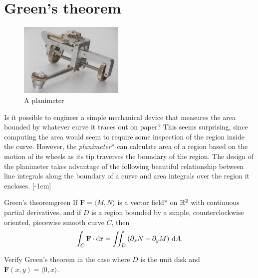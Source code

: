 \documentclass{watsonbook}
\begin{document}
\section{Green's theorem} \label{sec:greens}


\begin{figure}
  \includegraphics[width=5cm]{figures/planimeter}
  \caption{A planimeter \label{fig:planimeter}}
\end{figure}

Is it possible to engineer a simple mechanical device that measures
the area bounded by whatever curve it traces out on paper? This seems
surprising, since computing the area would seem to require some
inspection of the region inside the curve. However, the
\textit{planimeter}* can calculate area of a region based on the
motion of its wheels as its tip traverses the boundary of the
region. The design of the planimeter takes advantage of the following
beautiful relationship between line integrals along the boundary of a
curve and area integrals over the region it encloses. [-1cm]

\begin{theo}[left skip = 4.2cm, width = \dimexpr \textwidth -
  4.2cm \relax]{Green's theorem}{green}
  If $\mathbf{F} = \langle M, N\rangle$ is a vector field* on $\mathbb{R}^2$
  with continuous partial derivatives, and if $D$ is a region bounded
  by a simple, counterclockwise oriented, piecewise smooth curve $C$,
  then 
  \[
    \int_C \mathbf{F} \cdot \mathrm{d}\mathbf{r} = \iint_D \left(\partial_x N -
      \partial_y M \right) \, {\mathrm{d}}A. 
  \]
\end{theo}

\begin{example}{}{}
  Verify Green's theorem in the case where $D$ is the unit disk and
  $\mathbf{F}(x,y)= \langle 0, x \rangle$. 
\end{example}
\end{document}
